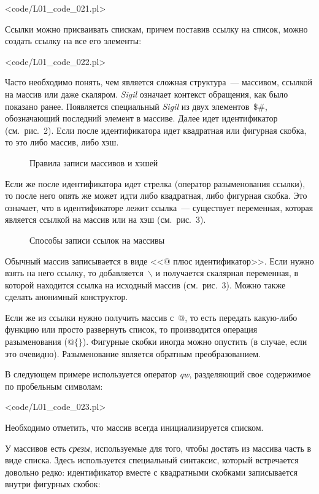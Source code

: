 \pr<code/L01_code_021.pl>

Ссылки можно присваивать спискам, причем поставив ссылку на список, можно создать ссылку на все его элементы:

\pr<code/L01_code_022.pl>

Часто необходимо понять, чем является сложная структура~--- массивом, ссылкой на массив или даже скаляром.
\textit{Sigil} означает контекст обращения, как было показано ранее.
Появляется специальный \textit{Sigil} из двух элементов~$\$\#$, обозначающий последний элемент в массиве.
Далее идет идентификатор (см.~рис.~2).
Если после идентификатора идет квадратная или фигурная скобка, то это либо массив, либо хэш.

\begin{figure}[h!]\center
	
	\caption{Правила записи массивов и хэшей}
\end{figure}

Если же после идентификатора идет стрелка (оператор разыменования ссылки), то после него опять же может идти либо квадратная, либо фигурная скобка.
Это означает, что в идентификаторе лежит ссылка~--- существует переменная, которая является ссылкой на массив или на хэш (см.~рис.~3).

\begin{figure}[h!]\center
	
	\caption{Способы записи ссылок на массивы}
\end{figure}

Обычный массив записывается в виде <<$@$ плюс идентификатор>>.
Если нужно взять на него ссылку, то добавляется~$\backslash$ и получается скалярная переменная, в которой находится ссылка на исходный массив (см.~рис.~3).
Можно также сделать анонимный конструктор.

Если же из ссылки нужно получить массив с~$@$, то есть передать какую-либо функцию или просто развернуть список, то производится операция разыменования ($@\{\}$).
Фигурные скобки иногда можно опустить (в случае, если это очевидно).
Разыменование является обратным преобразованием.

В следующем примере используется оператор \textit{qw}, разделяющий свое содержимое по пробельным символам:

\pr<code/L01_code_023.pl>

Необходимо отметить, что массив всегда инициализируется списком.

У массивов есть \textit{срезы}, используемые для того, чтобы достать из массива часть в виде списка.
Здесь используется специальный синтаксис, который встречается довольно редко: идентификатор вместе с квадратными скобками записывается внутри фигурных скобок:

